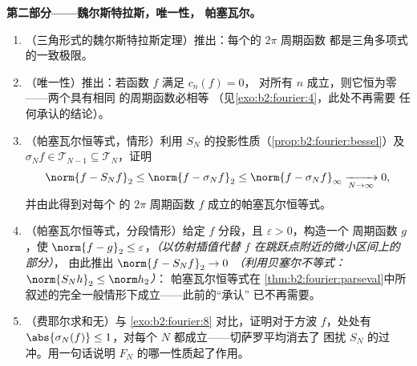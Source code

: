 \begin{problem}
\medskip
\noindent\textbf{第二部分——魏尔斯特拉斯，唯一性，
帕塞瓦尔。}
\begin{enumerate}[resume]
  \item （三角形式的魏尔斯特拉斯定理）推出：每个的
        $2\pi$ 周期函数
        都是三角多项式的一致极限。
  \item （唯一性）推出：若函数 $f$ 满足 $c_n(f) = 0$，
        对所有 $n$ 成立，则它恒为零——两个具有相同
        的周期函数必相等
        （见\cref{exo:b2:fourier:4}，此处不再需要
        任何承认的结论）。
  \item （帕塞瓦尔恒等式，情形）利用
        $S_N$ 的投影性质（\cref{prop:b2:fourier:bessel}）及
        $\sigma_Nf \in \mathcal T_{N-1} \subseteq \mathcal
        T_N$，证明
        \[
        \norm{f - S_Nf}_2 \leq \norm{f - \sigma_Nf}_2
        \leq \norm{f - \sigma_Nf}_\infty
        \xrightarrow[N\to\infty]{} 0 ,
        \]
        并由此得到对每个
        \emph{}的 $2\pi$ 周期函数 $f$ 成立的帕塞瓦尔恒等式。
  \item （帕塞瓦尔恒等式，分段情形）给定 $f$
        分段，且 $\varepsilon > 0$，构造一个
        周期函数 $g$，使 $\norm{f - g}_2 \leq
        \varepsilon$，\emph{（以仿射插值代替 $f$
        在跳跃点附近的微小区间上的部分）}，
        由此推出 $\norm{f - S_Nf}_2 \to 0$
        \emph{（利用贝塞尔不等式：$\norm{S_Nh}_2 \leq \norm h_2$）}：
        帕塞瓦尔恒等式在
        \cref{thm:b2:fourier:parseval}中所叙述的完全一般情形下成立——此前的“承认”
        已不再需要。
  \item （费耶尔求和无）与
        \cref{exo:b2:fourier:8} 对比，证明对于方波
        $f$，处处有 $\abs{\sigma_N(f)} \leq 1$，对每个
        $N$ 都成立——切萨罗平均消去了
        困扰 $S_N$ 的过冲。用一句话说明
        $F_N$ 的哪一性质起了作用。
\end{enumerate}


\end{problem}
